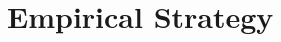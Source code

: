 \documentclass[12pt,letterpaper]{article}
\begin{document}
%  


\section{Empirical Strategy}\label{sec:empirical_strategy}
\end{document}

